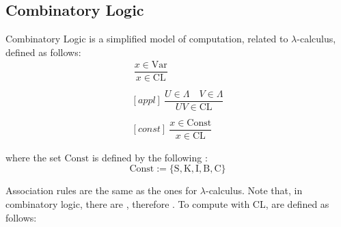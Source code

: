 \documentclass[a4paper, 12pt]{report}
\begin{document}
    
    \subsection{Combinatory Logic} \label{comb_logic}

    \begin{frameddefn}{Combinatory Logic}
         is a simplified model of computation, related to $\lambda$-calculus, defined as follows:
        \begin{gather*}
            [var] \ \dfrac{x \in \mathrm{Var}}{x \in \mathrm{CL}} \\ \\
            [appl] \ \dfrac{U \in \Lambda \quad V \in \Lambda}{U V \in \mathrm{CL}} \\ \\
            [const] \ \dfrac{x \in \mathrm{Const}}{x \in \mathrm{CL}}
        \end{gather*}

        where the set $\mathrm{Const}$ is defined by the following : $$\mathrm{Const} := \{\mathrm S, \mathrm K, \mathrm I, \mathrm B, \mathrm C\}$$
    \end{frameddefn}

    Association rules are the same as the ones for $\lambda$-calculus. Note that, in combinatory logic, there are , therefore . To compute with CL,  are defined as follows:
\end{document}
